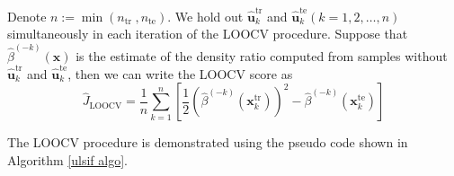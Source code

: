 \documentclass[a4paper,12pt]{article}
\begin{document}
Denote $n:=\min \left(n_{\text {tr }}, n_{\mathrm{te}}\right)$. We hold out $\widehat{\boldsymbol{u}}_{k}^{\mathrm{tr}}$ and $\widehat{\boldsymbol{u}}_{k}^{\mathrm{te}}(k=1,2, \ldots, n)$ simultaneously in each iteration of the LOOCV procedure. Suppose that $\widehat{\beta}^{(-k)}(\boldsymbol{x})$ is the estimate of the density ratio computed from samples without $\widehat{\boldsymbol{u}}_{k}^{\mathrm{tr}}$ and $\widehat{\boldsymbol{u}}_{k}^{\mathrm{te}}$, then we can write the LOOCV score as 
\begin{equation*}
\widehat{J}_{\mathrm{LOOCV}}=\frac{1}{n} \sum_{k=1}^{n}\left[\frac{1}{2}\left(\widehat{\beta}^{(-k)}\left({\boldsymbol{x}}_{k}^{\mathrm{tr}}\right)\right)^{2}-\widehat{\beta}^{(-k)}\left({\boldsymbol{x}}_{k}^{\mathrm{te}}\right)\right]
\end{equation*}

The LOOCV procedure is demonstrated using the pseudo code shown in Algorithm \ref{ulsif algo}.
\end{document}

